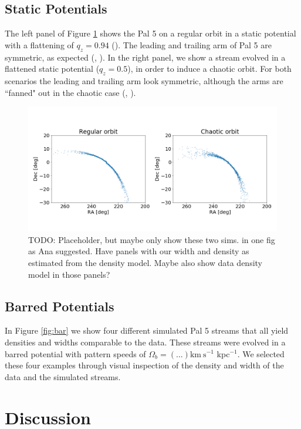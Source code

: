 \documentclass[modern]{aastex62}
\newcommand{\kms}{\ensuremath{\textrm{km}~\textrm{s}^{-1}}}
\newcommand{\todo}[1]{{\color{red} TODO: #1}}
\begin{document}
\subsection{Static Potentials}
The left panel of Figure \ref{fig:static} shows the Pal 5 on a regular orbit in a static potential with a flattening of $q_z = 0.94$ (\citealt{bovy:2017}). The leading and trailing arm of Pal 5 are symmetric, as expected (\citealt{dehnen:2004}, \citealt{Pearson:2015}). In the right panel, we show a stream evolved in a flattened static potential ($q_z = 0.5$), in order to induce a chaotic orbit. For both scenarios the leading and trailing arm look symmetric, although the arms are ``fanned" out in the chaotic case (\citealt{Pearson:2015}, \citealt{Price-Whelan:2016}). 

\begin{figure}
\centerline{\includegraphics[width=\columnwidth]{static.png}}
\caption{\todo{Placeholder, but maybe only show these two sims. in one fig as Ana suggested. Have panels with our width and density as estimated from the density model. Maybe also show data density model in those panels?}}
\label{fig:static}
\end{figure}

\subsection{Barred Potentials}
In Figure \ref{fig:bar} we show four different simulated Pal 5 streams that all yield densities and widths comparable to the data. These streams were evolved in a barred potential with pattern speeds of $\Omega_b = (...) \kms$ kpc$^{-1}$. We selected these four examples through visual inspection of the density and width of the data and the simulated streams. 


\section{Discussion}
\label{sec:discussion}
\end{document}
